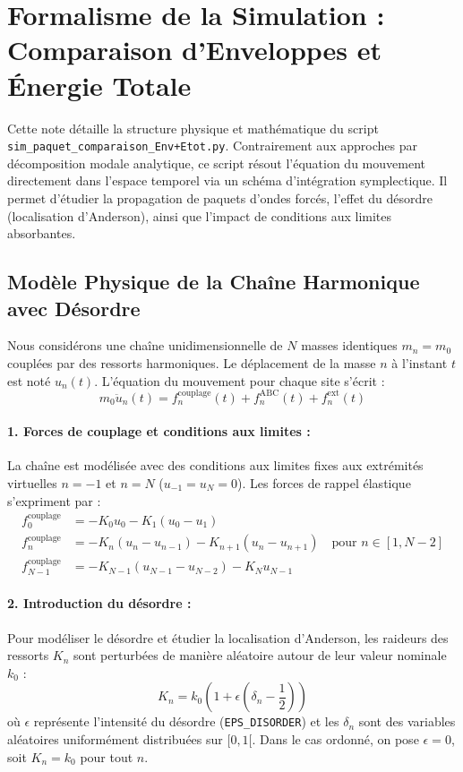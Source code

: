 \documentclass[11pt, a4paper]{report}
\begin{document}
\section{Formalisme de la Simulation : Comparaison d'Enveloppes et Énergie Totale}

Cette note détaille la structure physique et mathématique du script \texttt{sim\_paquet\_comparaison\_Env+Etot.py}. Contrairement aux approches par décomposition modale analytique, ce script résout l'équation du mouvement directement dans l'espace temporel via un schéma d'intégration symplectique. Il permet d'étudier la propagation de paquets d'ondes forcés, l'effet du désordre (localisation d'Anderson), ainsi que l'impact de conditions aux limites absorbantes.

\subsection{Modèle Physique de la Chaîne Harmonique avec Désordre}

Nous considérons une chaîne unidimensionnelle de $N$ masses identiques $m_n = m_0$ couplées par des ressorts harmoniques. Le déplacement de la masse $n$ à l'instant $t$ est noté $u_n(t)$. L'équation du mouvement pour chaque site s'écrit :
\begin{equation}
    m_0 \ddot{u}_n(t) = f_n^{\text{couplage}}(t) + f_n^{\text{ABC}}(t) + f_n^{\text{ext}}(t)
\end{equation}

\paragraph{1. Forces de couplage et conditions aux limites :}
La chaîne est modélisée avec des conditions aux limites fixes aux extrémités virtuelles $n = -1$ et $n = N$ ($u_{-1} = u_N = 0$). Les forces de rappel élastique s'expriment par :
\begin{align}
    f_0^{\text{couplage}} &= -K_0 u_0 - K_1 (u_0 - u_1) \\
    f_n^{\text{couplage}} &= -K_n (u_n - u_{n-1}) - K_{n+1} (u_n - u_{n+1}) \quad \text{pour } n \in [1, N-2] \\
    f_{N-1}^{\text{couplage}} &= -K_{N-1} (u_{N-1} - u_{N-2}) - K_N u_{N-1}
\end{align}

\paragraph{2. Introduction du désordre :}
Pour modéliser le désordre et étudier la localisation d'Anderson, les raideurs des ressorts $K_n$ sont perturbées de manière aléatoire autour de leur valeur nominale $k_0$ :
\begin{equation}
    K_n = k_0 \left(1 + \epsilon \left(\delta_n - \frac{1}{2}\right)\right)
\end{equation}
où $\epsilon$ représente l'intensité du désordre (\texttt{EPS\_DISORDER}) et les $\delta_n$ sont des variables aléatoires uniformément distribuées sur $[0, 1[$. Dans le cas ordonné, on pose $\epsilon = 0$, soit $K_n = k_0$ pour tout $n$.
\end{document}
